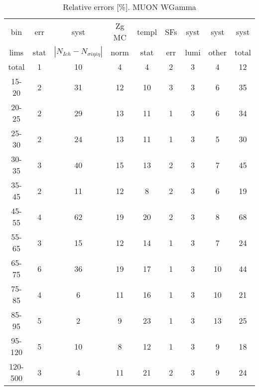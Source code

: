 \begin{table}[h]
  \scriptsize
  \begin{center}
  \caption{Relative errors [\%]. MUON WGamma}
   \begin{tabular}{|c|c|c|c|c|c|c|c|c|}
    bin  & err & syst & Zg MC & templ & SFs & syst & syst & syst\\
    lims  & stat & $|N_{Ich}-N_{\sigma{i\eta i\eta}}|$ & norm & stat & err & lumi & other & total\\ \hline
    total  & 1 & 10 & 4 & 4 & 2 & 3 & 4 & 12 \\ \hline
    15-20 & 2 & 31 & 12 & 10 & 3 & 3 & 6 & 35 \\ \hline
    20-25 & 2 & 29 & 13 & 11 & 1 & 3 & 6 & 34 \\ \hline
    25-30 & 2 & 24 & 13 & 11 & 1 & 3 & 5 & 30 \\ \hline
    30-35 & 3 & 40 & 15 & 13 & 2 & 3 & 7 & 45 \\ \hline
    35-45 & 2 & 11 & 12 & 8 & 2 & 3 & 6 & 19 \\ \hline
    45-55 & 4 & 62 & 19 & 20 & 2 & 3 & 8 & 68 \\ \hline
    55-65 & 3 & 15 & 12 & 14 & 1 & 3 & 7 & 24 \\ \hline
    65-75 & 6 & 36 & 19 & 17 & 1 & 3 & 10 & 44 \\ \hline
    75-85 & 4 & 6 & 11 & 16 & 1 & 3 & 10 & 21 \\ \hline
    85-95 & 5 & 2 & 9 & 23 & 1 & 3 & 13 & 25 \\ \hline
    95-120 & 5 & 10 & 8 & 12 & 1 & 3 & 9 & 18 \\ \hline
    120-500 & 3 & 4 & 11 & 21 & 2 & 3 & 9 & 24 \\ \hline
  \end{tabular}
  \label{tab:systInPercent_MUON_WGamma}
  \end{center}
\end{table}


